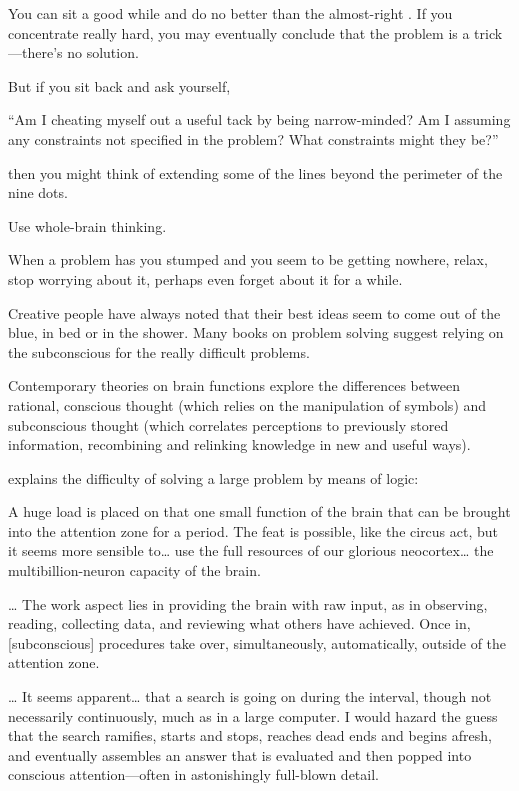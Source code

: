 
You can sit a good while and do no better than the almost-right
. If you concentrate really hard, you may eventually conclude
that the problem is a trick---there's no solution.



But if you sit back and ask yourself,
\begin{tfquot}
``Am I cheating myself out a useful tack by being narrow-minded? Am I
assuming any constraints not specified in the problem? What constraints
might they be?''
\end{tfquot}
then you might think of extending some of the lines beyond the perimeter
of the nine dots.

\begin{tip}
Use whole-brain thinking.
\end{tip}
When a problem has you stumped and you seem to be getting nowhere,
relax, stop worrying about it, perhaps even forget about it for a while.

Creative people have always noted that their best ideas seem to
come out of the blue, in bed or in the shower. Many books on problem
solving suggest relying on the subconscious for the really difficult
problems.

Contemporary theories on brain functions explore the differences
between rational, conscious thought (which relies on the manipulation of
symbols) and subconscious thought (which correlates perceptions to
previously stored information, recombining and relinking knowledge in
new and useful ways).

 \cite{hart75} explains the
difficulty of solving a large problem by means of logic:

\begin{tfquot}
A huge load is placed on that one small function of the brain that can be
brought into the attention zone for a period. The feat is possible, like
the circus act, but it seems more sensible to\dots{} use the full
resources of our glorious neocortex\dots{} the multibillion-neuron
capacity of the brain.

\dots{} The work aspect lies in providing the brain with raw input, as in
observing, reading, collecting data, and reviewing what others have
achieved.  Once in, [subconscious] procedures take over, simultaneously,
automatically, outside of the attention zone.

\dots{} It seems apparent\dots{} that a search is going on during the
interval, though not necessarily continuously, much as in a large
computer. I would hazard the guess that the search ramifies, starts and
stops, reaches dead ends and begins afresh, and eventually assembles an
answer that is evaluated and then popped into conscious attention---often
in astonishingly full-blown detail.
\end{tfquot}

